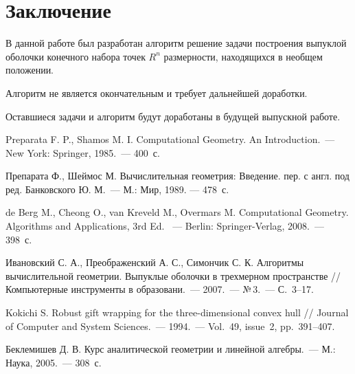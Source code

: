 \documentclass[14pt]{extarticle}
\begin{document}
\section*{Заключение}
В данной работе был разработан алгоритм решение задачи построения выпуклой оболочки конечного набора точек $R^n$ размерности, находящихся в необщем положении.

Алгоритм не является окончательным и требует дальнейшей доработки.

Оставшиеся задачи и алгоритм будут доработаны в будущей выпускной работе.
\newpage

\newpage
{}
\begin{thebibliography}{9}
 Preparata F. P., Shamos M. I. Computational Geometry. An Introduction.~--- New York: Springer, 1985.~--- 400~с.

 Препарата Ф., Шеймос М. Вычислительная геометрия: Введение. пер. с англ. под ред. Банковского Ю. М.~--- М.: Мир, 1989. --- 478~с.

 de Berg M., Cheong O., van Kreveld M., Overmars M. Computational Geometry. Algorithms and Applications, 3rd Ed. ~--- Berlin: Springer-Verlag, 2008.~--- 398~с.

 Ивановский С. А., Преображенский А. С., Симончик С. К. Алгоритмы вычислительной геометрии. Выпуклые оболочки в трехмерном пространстве // Компьютерные инструменты в образовани.~--- 2007.~--- №\,3.~--- С.~3--17.

 Kokichi S. Robust gift wrapping for the three-dimensional convex hull // Journal of Computer and System Sciences.~--- 1994.~--- Vol.~49, issue~2, pp.~391--407.

 Беклемишев Д. В. Курс аналитической геометрии и линейной алгебры.~--- М.: Наука, 2005.~--- 308~с.
\end{thebibliography}

\label{lastpage}
\end{document}
